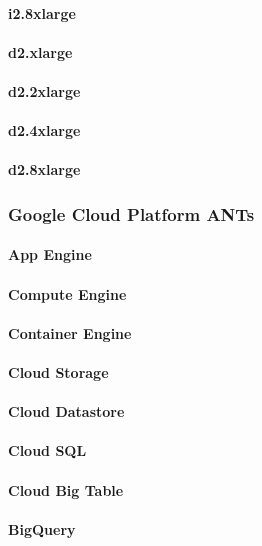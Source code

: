 \documentclass{acm_proc_article-sp}
\begin{document}
\paragraph{i2.8xlarge}
\paragraph{d2.xlarge}
\paragraph{d2.2xlarge}
\paragraph{d2.4xlarge}
\paragraph{d2.8xlarge}
\subsubsection{Google Cloud Platform ANTs}
\paragraph{App Engine}
\paragraph{Compute Engine}
\paragraph{Container Engine}
\paragraph{Cloud Storage}
\paragraph{Cloud Datastore}
\paragraph{Cloud SQL}
\paragraph{Cloud Big Table}
\paragraph{BigQuery}
\end{document}

